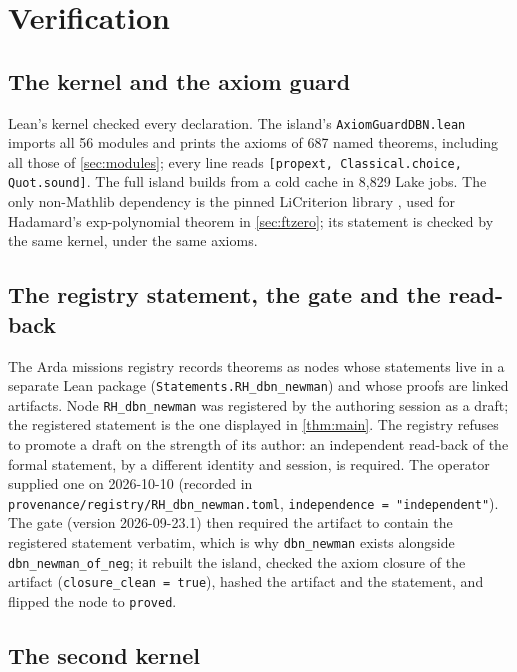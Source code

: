 \documentclass[11pt]{article}
\theoremstyle{definition}
\newcommand{\lean}[1]{\texttt{#1}}
\begin{document}
\section{Verification}\label{sec:verification}

\subsection{The kernel and the axiom guard}

Lean's kernel checked every declaration. The island's \lean{AxiomGuardDBN.lean} imports all 56 modules and prints the axioms of 687 named theorems, including all those of \cref{sec:modules}; every line reads \lean{[propext, Classical.choice, Quot.sound]}. The full island builds from a cold cache in 8,829 Lake jobs. The only non-Mathlib dependency is the pinned LiCriterion library \cite{LiCrit}, used for Hadamard's exp-polynomial theorem in \cref{sec:ftzero}; its statement is checked by the same kernel, under the same axioms.

\subsection{The registry statement, the gate and the read-back}

The Arda missions registry \cite{Arda} records theorems as nodes whose statements live in a separate Lean package (\lean{Statements.RH\_dbn\_newman}) and whose proofs are linked artifacts. Node \lean{RH\_dbn\_newman} was registered by the authoring session as a draft; the registered statement is the one displayed in \cref{thm:main}. The registry refuses to promote a draft on the strength of its author: an independent read-back of the formal statement, by a different identity and session, is required. The operator supplied one on 2026-10-10 (recorded in \lean{provenance/registry/RH\_dbn\_newman.toml}, \lean{independence = "independent"}). The gate (version 2026-09-23.1) then required the artifact to contain the registered statement verbatim, which is why \lean{dbn\_newman} exists alongside \lean{dbn\_newman\_of\_neg}; it rebuilt the island, checked the axiom closure of the artifact (\lean{closure\_clean = true}), hashed the artifact and the statement, and flipped the node to \lean{proved}.

\subsection{The second kernel}
\end{document}
